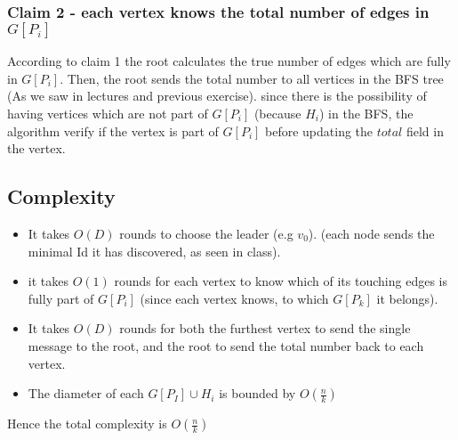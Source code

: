 \documentclass[11pt]{article}
\begin{document}
\begin{enumerate}
\subsubsection*{Claim 2 - each vertex knows the total number of edges in $G[P_i]$}
According to claim 1 the root calculates the true number of edges which are fully in $G[P_i]$.
Then, the root sends the total number to all vertices in the BFS tree (As we saw in lectures and previous exercise). since there is the possibility of having vertices which are not part of $G[P_i]$ (because $H_i$) in the BFS, the algorithm verify if the vertex is part of $G[P_i]$ before updating the $total$ field in the vertex.


\subsection*{Complexity}
\begin{itemize}
    \item It takes $O(D)$ rounds to choose the leader (e.g $v_0$). (each node sends the minimal Id it has discovered, as seen in class).
    \item it takes $O(1)$ rounds for each vertex to know which of its touching edges is fully part of $G[P_i]$ (since each vertex knows, to which $ G[P_k] $ it belongs).
    \item It takes $O(D)$ rounds for both the furthest vertex to send the single message to the root, and the root to send the total number back to each vertex.
    \item The diameter of each $G[P_I] \cup H_i$ is bounded by $O(\frac{n}{k})$
\end{itemize}
Hence the total complexity is $O(\frac{n}{k})$

\end{enumerate}
\end{document}
